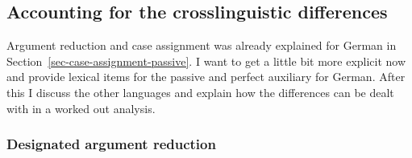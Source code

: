 




\subsection{Accounting for the crosslinguistic differences}

Argument reduction and case assignment was already explained for German in
Section~\ref{sec-case-assignment-passive}. I want to get a little bit more explicit now and provide
lexical items for the passive and perfect auxiliary for German. After this I discuss the other
languages and explain how the differences can be dealt with in a worked out analysis.

\subsubsection{Designated argument reduction}


